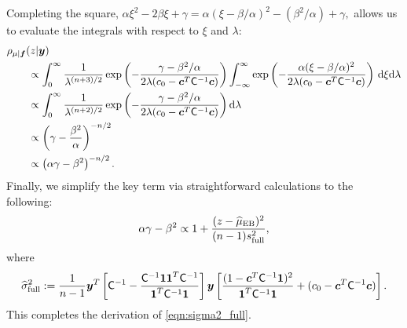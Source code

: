 \documentclass{svjour3}                     %
\newcommand{\bm}[1]{\boldsymbol{#1}}
\newcommand{\D}[1]{\text{d}{#1}}
\newcommand{\vc}{\bm{c}}
\newcommand{\vf}{\bm{f}}
\newcommand{\vy}{\bm{y}}
\newcommand{\vone}{\bm{1}}
\newcommand{\mC}{\mathsf{C}}
\newcommand{\hmu}{\widehat{\mu}}
\newcommand{\hsigma}{\widehat{\sigma}}
\newcommand{\MLE}{\textup{EB}}
\begin{document}
\begin{appendices}
Completing the square, $
\alpha \xi^2 -2 \beta \xi + \gamma 
= \alpha (\xi -\beta/\alpha)^2  - (\beta^2/\alpha) + \gamma,
$
allows us to evaluate the integrals with respect to $\xi$ and $\lambda$:
\begin{align*}
\MoveEqLeft{\rho_{\mu|\vf}(z | \vy)} \\
& \propto \displaystyle \int_{0}^\infty  \frac{1}{\lambda^{(n+3)/2}}  \exp\left( -\frac{  \gamma - \beta^2/\alpha}{2\lambda(c_0  -\vc ^T \mC^{-1} \vc)} \right)  
\int_{-\infty}^\infty  \exp\left( -\frac{\alpha (\xi -\beta/\alpha)^2}{2\lambda(c_0  -\vc ^T \mC^{-1} \vc)} \right) \, \D \xi \D \lambda \\
& \propto \displaystyle \int_{0}^\infty  \frac{1}{\lambda^{(n+2)/2}}  \exp\left( -\frac{  \gamma - \beta^2/\alpha}{2\lambda(c_0  -\vc ^T \mC^{-1} \vc)} \right) \D \lambda \\
& \propto \left(\gamma - \frac{\beta^2}{\alpha}\right)^{-n/2} \\
& \propto \left(\alpha \gamma - \beta^2\right)^{-n/2}.
\end{align*}
Finally, we simplify the key term via straightforward calculations to the following:
\begin{align*}
\alpha \gamma - \beta^2 \propto 1 +  \frac{(z - \hmu_{\MLE})^2}{(n-1)s_{\textup{full}}^2},
\end{align*}
where 
\begin{multline*}
\hsigma_{\textup{full}}^2
:= \frac{1}{n-1}
\vy^T\left[ \mC^{-1} 
- \frac{ \mC^{-1} \vone\vone^T \mC^{-1}}{\vone^T \mC^{-1} \vone}  \right]\vy
\left[\frac{(1 - \vc^T \mC^{-1} \vone)^2}{\vone^T \mC^{-1} \vone} + (c_0  -\vc ^T \mC^{-1} \vc) \right].
\end{multline*}
This completes the derivation of \eqref{eqn:sigma2_full}.
\end{appendices}

\end{document}
